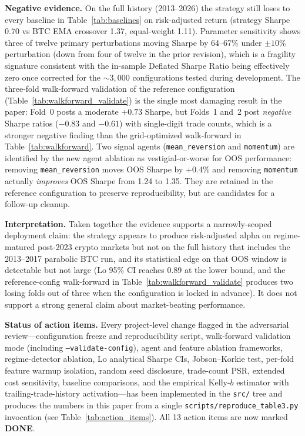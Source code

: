 \documentclass{article}
\begin{document}
\textbf{Negative evidence.}
On the full history (2013--2026) the strategy still loses to every baseline in Table~\ref{tab:baselines} on risk-adjusted return (strategy Sharpe 0.70 vs BTC EMA crossover 1.37, equal-weight 1.11).
Parameter sensitivity shows three of twelve primary perturbations moving Sharpe by 64--67\% under $\pm 10\%$ perturbation (down from four of twelve in the prior revision), which is a fragility signature consistent with the in-sample Deflated Sharpe Ratio being effectively zero once corrected for the $\sim 3{,}000$ configurations tested during development.
The three-fold walk-forward validation of the reference configuration (Table~\ref{tab:walkforward_validate}) is the single most damaging result in the paper: Fold~0 posts a moderate $+0.73$ Sharpe, but Folds~1 and~2 post \emph{negative} Sharpe ratios ($-0.83$ and $-0.61$) with single-digit trade counts, which is a stronger negative finding than the grid-optimized walk-forward in Table~\ref{tab:walkforward}.
Two signal agents (\texttt{mean\_reversion} and \texttt{momentum}) are identified by the new agent ablation as vestigial-or-worse for OOS performance: removing \texttt{mean\_reversion} moves OOS Sharpe by $+0.4\%$ and removing \texttt{momentum} actually \emph{improves} OOS Sharpe from 1.24 to 1.35. They are retained in the reference configuration to preserve reproducibility, but are candidates for a follow-up cleanup.

\textbf{Interpretation.}
Taken together the evidence supports a narrowly-scoped deployment claim: the strategy appears to produce risk-adjusted alpha on regime-matured post-2023 crypto markets but not on the full history that includes the 2013--2017 parabolic BTC run, and its statistical edge on that OOS window is detectable but not large (Lo 95\% CI reaches 0.89 at the lower bound, and the reference-config walk-forward in Table~\ref{tab:walkforward_validate} produces two losing folds out of three when the configuration is locked in advance).
It does not support a strong general claim about market-beating performance.

\textbf{Status of action items.}
Every project-level change flagged in the adversarial review---configuration freeze and reproducibility script, walk-forward validation mode (including \texttt{--validate-config}), agent and feature ablation frameworks, regime-detector ablation, Lo analytical Sharpe CIs, Jobson--Korkie test, per-fold feature warmup isolation, random seed disclosure, trade-count PSR, extended cost sensitivity, baseline comparisons, and the empirical Kelly-$b$ estimator with trailing-trade-history activation---has been implemented in the \texttt{src/} tree and produces the numbers in this paper from a single \texttt{scripts/reproduce\_table3.py} invocation (see Table~\ref{tab:action_items}). All 13 action items are now marked \textbf{DONE}.
\end{document}
